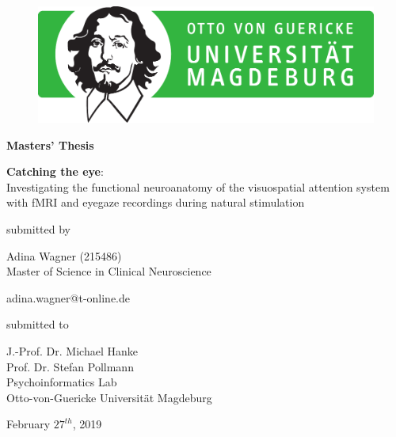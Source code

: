 \documentclass[a4paper, 12pt]{scrreprt}
\begin{document}

\begin{figure}[h]
\vspace{-1.5cm}
\hspace{9.5cm}
\includegraphics[scale=0.5]{img/ovgu_nat_logo}
\label{logoOVGU}
\end{figure}

\begin{center}
\bigskip
\begin{LARGE}
\textbf{Masters' Thesis}
\end{LARGE}

\vspace{\fill}

\begin{huge}
 
\textbf{Catching the eye}: \\
Investigating the functional neuroanatomy of the visuospatial attention system with fMRI and eyegaze recordings during natural stimulation

\end{huge}

\vspace{\fill}

submitted by\\
\begin{large}
Adina Wagner (215486) \\
\vspace{0.3cm}
Master of Science in Clinical Neuroscience\\
\begin{normalsize}
adina.wagner@t-online.de 
\end{normalsize}

\vspace{\fill}

\begin{normalsize}
submitted to\\
\end{normalsize}
J.-Prof. Dr. Michael Hanke\\
Prof. Dr. Stefan Pollmann\\
\vspace{0.5cm}
Psychoinformatics Lab\\
Otto-von-Guericke Universität Magdeburg\\
\end{large}

\vspace{1cm}

February $27^{th}$, 2019

\thispagestyle{empty}
\end{center}
\clearpage
\end{document}
